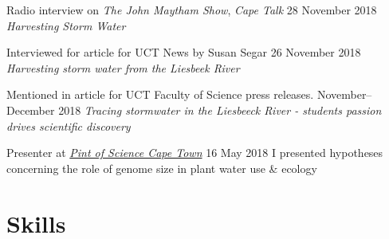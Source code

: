 \documentclass[10pt]{article}
\begin{document}
\begin{hangparas}{2em}{1}


Radio interview on \textit{The John Maytham Show}, \textit{Cape Talk}
                                                  \hfill 28 November 2018 \break
\textit{Harvesting Storm Water}

Interviewed for article for UCT News by Susan Segar
                                                  \hfill 26 November 2018 \break
\textit{Harvesting storm water from the Liesbeek River}

Mentioned in article for UCT Faculty of Science press releases.
                                           \hfill November--December 2018 \break
\textit{Tracing stormwater in the Liesbeeck River - students passion drives
scientific discovery}

Presenter at \href{http://pintofsciencesa.wixsite.com/pintofsciencesa/uct-planet-earth-16}
{\textit{Pint of Science Cape Town}}                   \hfill 16 May 2018 \break
I presented hypotheses concerning the role of genome size in plant water use 
\& ecology

\hfill

\end{hangparas}

\section*{Skills} %
\end{document}

